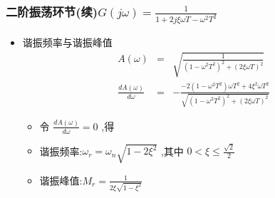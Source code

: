 \documentclass[table]{article}
\begin{document}
\subsubsection{二阶振荡环节(续)\(G(j\omega) = \frac{1}{1+2j\xi\omega T-\omega^2 T^2}\)}
\label{sec:org65271dc}
\begin{itemize}
\item 谐振频率与谐振峰值
\begin{eqnarray*}
A(\omega) &=& \sqrt{\frac{1}{(1-\omega^2 T^2)^2+(2\xi\omega T)^2}}\\
\frac{dA(\omega)}{d\omega} &=& -\frac{-2(1-\omega^2 T^2)\omega T^2+4\xi^2\omega T^2}{\sqrt{(1-\omega^2 T^2)^2+(2\xi\omega T)^2}}
\end{eqnarray*}
\begin{itemize}
\item <2-> 令 \(\frac{dA(\omega)}{d\omega}=0\) ,得
\end{itemize}
\begin{itemize}
\item 谐振频率:\(\omega_r=\omega_n\sqrt{1-2\xi^2}\) ,其中 \(0<\xi\leq\frac{\sqrt{2}}{2}\)
\item 谐振峰值:\(M_r=\frac{1}{2\xi\sqrt{1-\xi^2}}\)
\end{itemize}
\end{itemize}
\end{document}
